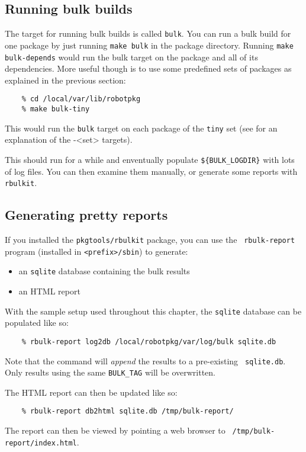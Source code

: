 \subsection{Running bulk builds} %
\label{section:bulk:run}

The target for running bulk builds is called {\tt bulk}. You can run a bulk
build for one package by just running {\tt make bulk} in the package
directory. Running {\tt make bulk-depends} would run the bulk target on the
package and all of its dependencies. More useful though is to use some
predefined sets of packages as explained in the previous section:
\begin{verbatim}
	% cd /local/var/lib/robotpkg
	% make bulk-tiny
\end{verbatim}
This would run the {\tt bulk} target on each package of the {\tt tiny} set (see
  for an
explanation of the -<set> targets).

This should run for a while and enventually populate {\tt\$\{BULK\_LOGDIR\}}
with lots of log files. You can then examine them manually, or generate some
reports with {\tt rbulkit}.

\subsection{Generating pretty reports} %
\label{section:bulk:report}

If you installed the {\tt pkgtools/rbulkit} package, you can use the {\tt
rbulk-report} program (installed in {\tt <prefix>/sbin}) to generate:
\begin{itemize}
   \item an {\tt sqlite} database containing the bulk results
   \item an HTML report
\end{itemize}

With the sample setup used throughout this chapter, the {\tt sqlite} database
can be populated like so:
\begin{verbatim}
	% rbulk-report log2db /local/robotpkg/var/log/bulk sqlite.db
\end{verbatim}
Note that the command will {\em append} the results to a pre-existing {\tt
sqlite.db}. Only results using the same {\tt BULK\_TAG} will be overwritten.

The HTML report can then be updated like so:
\begin{verbatim}
	% rbulk-report db2html sqlite.db /tmp/bulk-report/
\end{verbatim}
The report can then be viewed by pointing a web browser to {\tt
/tmp/bulk-report/index.html}.

